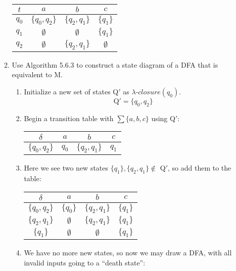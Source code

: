 \documentclass[12pt]{article}
\begin{document}
\begin{enumerate}
\begin{enumerate}
      \begin{center}
        \begin{tabular}{c|ccc}
          $t$ & $a$ & $b$ & $c$ \\
          \hline
          $q_0$ & $\{q_0,q_2\}$ & $\{q_2,q_1\}$ & $\{q_1\}$ \\
          $q_1$ & $\emptyset$ & $\emptyset$ & $\{q_1\}$ \\
          $q_2$ & $\emptyset$ & $\{q_2,q_1\}$ & $\emptyset$ \\          
        \end{tabular}
      \end{center}

    \item Use Algorithm 5.6.3 to construct a state diagram of a DFA that is equivalent to M. \\
      \begin{enumerate}
        \item Initialize a new set of states Q$'$ as $\lambda\text{-}closure(q_0)$.
          \[ \text{Q}'=\{q_0,q_2\} \]
        \item Begin a transition table with $\sum\{a,b,c\}$ using Q$'$: 
          \begin{center}
            \begin{tabular}{c|ccc}
              $\delta$ & $a$ & $b$ & $c$ \\
              \hline
              $\{q_0,q_2\}$ & $q_0$ & $\{q_2,q_1\}$ & $q_1$ \\
            \end{tabular}
          \end{center} 
        \item Here we see two new states $\{q_1\}, \{q_2,q_1\} \not \in $ Q$'$, so add them to the table: 
          \begin{center}
            \begin{tabular}{c|ccc}
              $\delta$ & $a$ & $b$ & $c$ \\
              \hline
              $\{q_0,q_2\}$ & $\{q_0\}$ & $\{q_2,q_1\}$ & $\{q_1\}$ \\
              $\{q_2,q_1\}$ & $\emptyset$ & $\{q_2,q_1\}$ & $\{q_1\}$ \\
              $\{q_1\}$ & $\emptyset$ & $\emptyset$ & $\{q_1\}$ \\
            \end{tabular}
          \end{center} 
        \item We have no more new states, so now we may draw a DFA, with all invalid inputs going to a ``death state'': \\

\end{enumerate}
\end{enumerate}
\end{enumerate}
\end{document}
